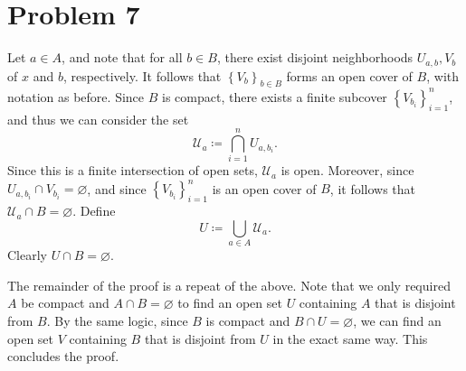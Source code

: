 \documentclass[11pt, letterpaper]{article}
\begin{document}
\section*{Problem 7}
Let $a\in A$, and note that for all $b\in B$, there exist disjoint neighborhoods $U_{a,b} ,V_b$ of $x$ and $b$, respectively. It follows that $\left\{ V_b \right\}_{b\in B} $ forms an open cover of $B$, with notation as before. Since $B$ is compact, there exists a finite subcover $\left\{ V_{b_i}  \right\}_{i=1}^n$, and thus we can consider the set
\[
	\mathcal{U}_a \coloneqq \bigcap_{i=1}^n U_{a,b_i} 
.\]
Since this is a finite intersection of open sets, $\mathcal{U}_a$ is open. Moreover, since $U_{a,b_i} \cap V_{b_i} =\varnothing $, and since $\left\{ V_{b_i}  \right\}_{i=1}^n$ is an open cover of $B$, it follows that $\mathcal{U}_a \cap B=\varnothing $. Define
\[
	U\coloneqq \bigcup_{a\in A} \mathcal{U}_a
.\]
Clearly $U \cap B=\varnothing $.

The remainder of the proof is a repeat of the above. Note that we only required $A$ be compact and $A \cap B=\varnothing $ to find an open set $U$ containing $A$ that is disjoint from $B$. By the same logic, since $B$ is compact and $B \cap U=\varnothing $, we can find an open set $V$ containing $B$ that is disjoint from $U$ in the exact same way. This concludes the proof.
\end{document}
